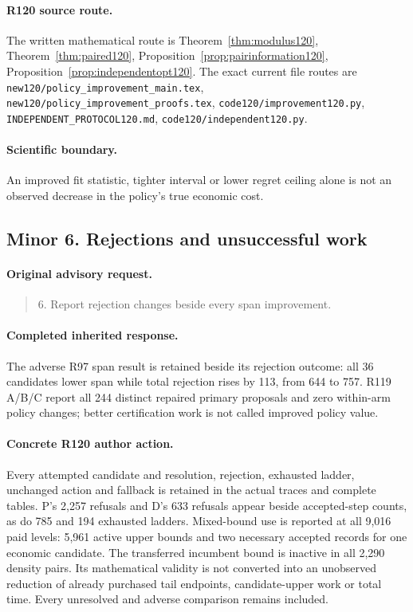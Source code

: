 \paragraph{R120 source route.}
The written mathematical route is Theorem~\ref{thm:modulus120}, Theorem~\ref{thm:paired120}, Proposition~\ref{prop:pairinformation120}, Proposition~\ref{prop:independentopt120}. The exact current file routes are \nolinkurl{new120/policy_improvement_main.tex}, \nolinkurl{new120/policy_improvement_proofs.tex}, \nolinkurl{code120/improvement120.py}, \nolinkurl{INDEPENDENT_PROTOCOL120.md}, \nolinkurl{code120/independent120.py}.
\paragraph{Scientific boundary.}
An improved fit statistic, tighter interval or lower regret ceiling alone is not an observed decrease in the policy's true economic cost.

\subsection{Minor 6. Rejections and unsuccessful work}
\label{response120:minor-6}
\paragraph{Original advisory request.}
\begin{quote}
6. Report rejection changes beside every span improvement.
\end{quote}
\paragraph{Completed inherited response.}
The adverse R97 span result is retained beside its rejection outcome: all 36 candidates lower span while total rejection rises by 113, from 644 to 757. R119 A/B/C report all 244 distinct repaired primary proposals and zero within-arm policy changes; better certification work is not called improved policy value.
\paragraph{Concrete R120 author action.}
Every attempted candidate and resolution, rejection, exhausted ladder, unchanged action and fallback is retained in the actual traces and complete tables. P's 2,257 refusals and D's 633 refusals appear beside accepted-step counts, as do 785 and 194 exhausted ladders. Mixed-bound use is reported at all 9,016 paid levels: 5,961 active upper bounds and two necessary accepted records for one economic candidate. The transferred incumbent bound is inactive in all 2,290 density pairs. Its mathematical validity is not converted into an unobserved reduction of already purchased tail endpoints, candidate-upper work or total time. Every unresolved and adverse comparison remains included.


